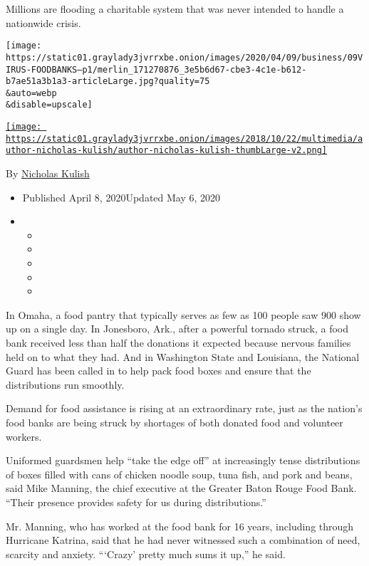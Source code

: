 Millions are flooding a charitable system that was never intended to
handle a nationwide crisis.

\texttt{[image: https://static01.graylady3jvrrxbe.onion/images/2020/04/09/business/09VIRUS-FOODBANKS--p1/merlin\_171270876\_3e5b6d67-cbe3-4c1e-b612-b7ae51a3b1a3-articleLarge.jpg?quality=75\\\&auto=webp\\\&disable=upscale]}

\href{https://www.nytimes3xbfgragh.onion/by/nicholas-kulish}{\texttt{[image: https://static01.graylady3jvrrxbe.onion/images/2018/10/22/multimedia/author-nicholas-kulish/author-nicholas-kulish-thumbLarge-v2.png]}}

By \href{https://www.nytimes3xbfgragh.onion/by/nicholas-kulish}{Nicholas
Kulish}

\begin{itemize}
\item
  Published April 8, 2020Updated May 6, 2020
\item
  \begin{itemize}
  \item
  \item
  \item
  \item
  \item
  \end{itemize}
\end{itemize}

In Omaha, a food pantry that typically serves as few as 100 people saw
900 show up on a single day. In Jonesboro, Ark., after a powerful
tornado struck, a food bank received less than half the donations it
expected because nervous families held on to what they had. And in
Washington State and Louisiana, the National Guard has been called in to
help pack food boxes and ensure that the distributions run smoothly.

Demand for food assistance is rising at an extraordinary rate, just as
the nation's food banks are being struck by shortages of both donated
food and volunteer workers.

Uniformed guardsmen help ``take the edge off'' at increasingly tense
distributions of boxes filled with cans of chicken noodle soup, tuna
fish, and pork and beans, said Mike Manning, the chief executive at the
Greater Baton Rouge Food Bank. ``Their presence provides safety for us
during distributions.''

Mr. Manning, who has worked at the food bank for 16 years, including
through Hurricane Katrina, said that he had never witnessed such a
combination of need, scarcity and anxiety. ```Crazy' pretty much sums it
up,'' he said.

